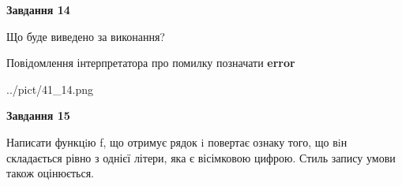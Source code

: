 \documentclass[11pt, ukrainian]{article}
\begin{document}
{\begin {large}
{\begin {center}\textbf{Завдання 14}\end {center}}\par
Що буде виведено за виконання? \par
Повідомлення інтерпретатора про помилку позначати \textbf{error}

\begin{center}
	{../pict/41_14.png}
\end{center}
\newpage

{\begin {center}\textbf{Завдання 15}\end {center}}\par

Написати функцiю f, що отримує рядок i повертає ознаку того, що вiн складається рівно з однієї літери, яка є вісімковою цифрою. Стиль запису умови також оцінюється.\par
\newpage

\end {large}}
\end{document}
